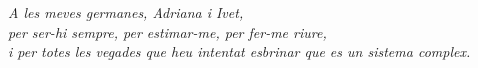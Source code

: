 \thispagestyle{empty}

\vspace*{8 cm}

\begin{flushright}
    \sffamily\Large
    \textit{
    A les meves germanes, Adriana i Ivet,\\
    per ser-hi sempre, per estimar-me, per fer-me riure, \\
    i per totes les vegades que heu intentat esbrinar que es un sistema complex.\\
    }
\end{flushright}